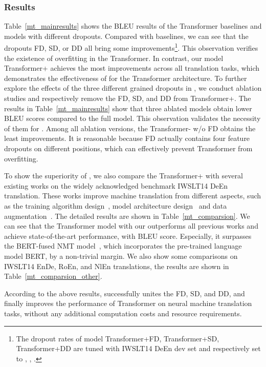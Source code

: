 \documentclass[11pt]{article}
\begin{document}
\subsubsection{Results}


Table~\ref{mt_mainresults} shows the BLEU results of the Transformer baselines and models with different dropouts. Compared with baselines, we can see that the dropouts FD, SD, or DD all bring some improvements\footnote{The dropout rates of model Transformer+FD, Transformer+SD, Transformer+DD are tuned with IWSLT14 DeEn dev set and respectively set to , , .}. This observation verifies the existence of overfitting in the Transformer. In contrast, our model Transformer+ achieves the most improvements across all translation tasks, which demonstrates the effectiveness of  for the Transformer architecture. To further explore the effects of the three different grained dropouts in , we conduct ablation studies and respectively remove the FD, SD, and DD from Transformer+. The results in Table~\ref{mt_mainresults} show that three ablated models obtain lower BLEU scores compared to the full model. This observation validates the necessity of them for . Among all ablation versions, the Transformer- w/o FD obtains the least improvements. It is reasonable because FD actually contains four feature dropouts on different positions, which can effectively prevent Transformer from overfitting.

To show the superiority of , we also compare the Transformer+ with several existing works on the widely acknowledged benchmark IWSLT14 DeEn translation. These works improve machine translation from different aspects, such as the training algorithm design~\cite{DBLP:conf/icml/WangG019}, model architecture design~\cite{lu2019understanding,wu2018pay} and data augmentation~\cite{DBLP:conf/acl/GaoZWXQCZL19}. The detailed results are shown in Table~\ref{mt_comparsion}. We can see that the Transformer model with our  outperforms all previous works and achieve state-of-the-art performance, with  BLEU score. Especially, it surpasses the BERT-fused NMT model~\cite{DBLP:conf/iclr/ZhuXWHQZLL20}, which incorporates the pre-trained language model BERT, by a non-trivial margin. We also show some comparisons on IWSLT14 EnDe, RoEn, and NlEn translations, the results are shown in Table~\ref{mt_comparsion_other}.

According to the above results,  successfully unites the FD, SD, and DD, and finally improves the performance of Transformer on neural machine translation tasks, without any additional computation costs and resource requirements.
\end{document}
